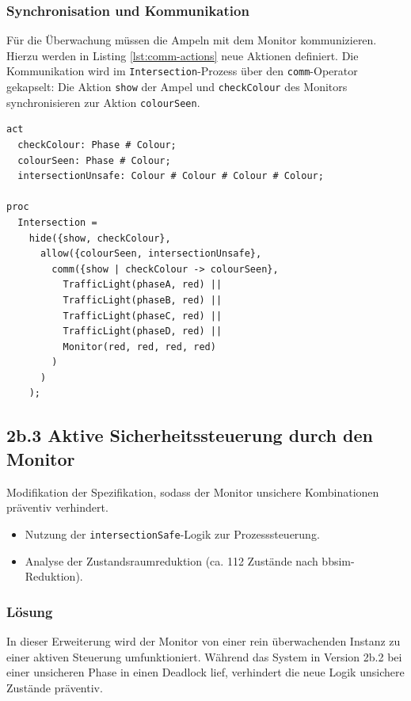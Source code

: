 \documentclass{article}
\begin{document}
\subsubsection{Synchronisation und Kommunikation}
Für die Überwachung müssen die Ampeln mit dem Monitor kommunizieren. Hierzu werden in Listing \ref{lst:comm-actions} neue Aktionen definiert. Die Kommunikation wird im \texttt{Intersection}-Prozess über den \texttt{comm}-Operator gekapselt: Die Aktion \texttt{show} der Ampel und \texttt{checkColour} des Monitors synchronisieren zur Aktion \texttt{colourSeen}.

\begin{lstlisting}[caption={Erweiterte Aktionen und Systemkomposition}, label={lst:comm-actions}]
act
  checkColour: Phase # Colour;
  colourSeen: Phase # Colour;
  intersectionUnsafe: Colour # Colour # Colour # Colour;

proc
  Intersection =
    hide({show, checkColour},
      allow({colourSeen, intersectionUnsafe},
        comm({show | checkColour -> colourSeen},
          TrafficLight(phaseA, red) ||
          TrafficLight(phaseB, red) ||
          TrafficLight(phaseC, red) ||
          TrafficLight(phaseD, red) ||
          Monitor(red, red, red, red)
        )
      )
    );
\end{lstlisting}



\subsection{2b.3 Aktive Sicherheitssteuerung durch den Monitor}
Modifikation der Spezifikation, sodass der Monitor unsichere Kombinationen präventiv verhindert.
\begin{itemize}
    \item Nutzung der \texttt{intersectionSafe}-Logik zur Prozesssteuerung.
    \item Analyse der Zustandsraumreduktion (ca. 112 Zustände nach bbsim-Reduktion).
\end{itemize}

\subsubsection*{Lösung}
In dieser Erweiterung wird der Monitor von einer rein überwachenden Instanz zu einer aktiven Steuerung umfunktioniert. Während das System in Version 2b.2 bei einer unsicheren Phase in einen Deadlock lief, verhindert die neue Logik unsichere Zustände präventiv.
\end{document}
